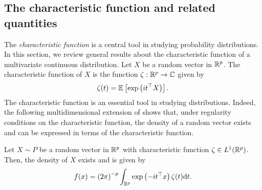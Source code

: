 \subsection{The characteristic function and related quantities} \label{sec-charfun}

The \textit{characteristic function} is a central tool in studying probability distributions. In this section, we review general results about the characteristic function of a multivariate continuous distribution. Let $X$ be a random vector in $\Rp$. The characteristic function of $X$ is the function $\zeta : \Rp \rightarrow \C$ given by
\begin{equation*}
    \zeta(t) = \expec{}{\expf{it^\top X}}.
\end{equation*}
The characteristic function is an essential tool in studying distributions. Indeed, the following multidimensional extension of \cite[Theorem 2.4.2]{kolassa2006series} shows that, under regularity conditions on the characteristic function, the density of a random vector exists and can be expressed in terms of the characteristic function.

\begin{theorem} \label{thm-char-inversion}
    Let $X \sim P$ be a random vector in $\Rp$ with characteristic function $\zeta \in L^1(\Rp)$. Then, the density of $X$ exists and is given by
    \begin{equation} \label{eq-density-via-charfun}
        f(x) = \left(2\pi\right)^{-p} \intRp{t}{ \expf{-it^\top x}\zeta(t) }.
    \end{equation}
\end{theorem}

